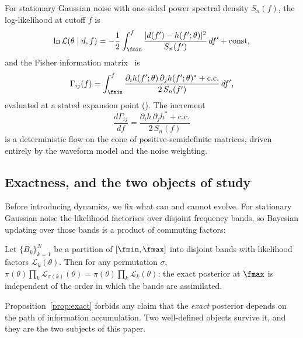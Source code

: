 For stationary Gaussian noise with one-sided power spectral density
$S_n(f)$, the log-likelihood at cutoff $f$ is
\begin{equation}
\ln \mathcal{L}(\theta \mid d, f) = -\frac12 \int_{\fmin}^{f}
\frac{|d(f') - h(f'; \theta)|^2}{S_n(f')}\,df' + \text{const},
\label{eq:likelihood}
\end{equation}
and the Fisher information matrix~{\cite{cutler1994fisher,vallisneri2008fisher}}
is
\begin{equation}
\Gamma_{ij}(f) = \int_{\fmin}^{f}
\frac{\partial_i h(f';\theta)\,\partial_j h(f';\theta)^{*} + \text{c.c.}}
{2\,S_n(f')}\,df',
\label{eq:fisher}
\end{equation}
evaluated at a stated expansion point (). The
increment
\begin{equation}
\frac{d\Gamma_{ij}}{df} =
\frac{\partial_i h\,\partial_j h^{*} + \text{c.c.}}{2\,S_n(f)}
\label{eq:fisher_flow}
\end{equation}
is a deterministic flow on the cone of positive-semidefinite matrices,
driven entirely by the waveform model and the noise weighting.

\subsection{Exactness, and the two objects of study}
\label{sec:exactness}

Before introducing dynamics, we fix what can and cannot evolve. For
stationary Gaussian noise the likelihood factorises over disjoint
frequency bands, so Bayesian updating over those bands is a product of
commuting factors:

\begin{proposition}
\label{prop:exact}
Let $\{B_k\}_{k=1}^{N}$ be a partition of $[\fmin,\fmax]$ into disjoint
bands with likelihood factors $\mathcal{L}_k(\theta)$. Then for any
permutation $\sigma$,
$\pi(\theta)\prod_k \mathcal{L}_{\sigma(k)}(\theta)
= \pi(\theta)\prod_k \mathcal{L}_{k}(\theta)$:
the exact posterior at $\fmax$ is independent of the order in which the
bands are assimilated.
\end{proposition}

Proposition~\ref{prop:exact} forbids any claim that the \emph{exact}
posterior depends on the path of information accumulation. Two
well-defined objects survive it, and they are the two subjects of this
paper.

